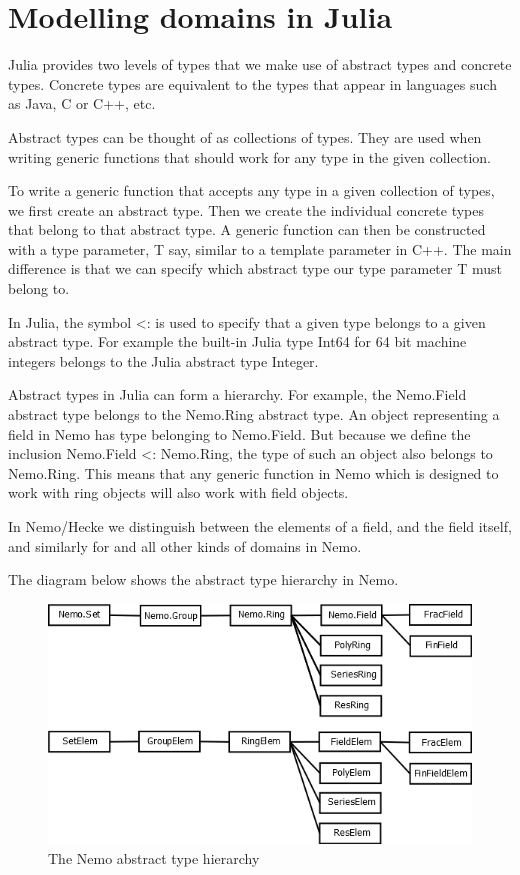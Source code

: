 \documentclass{sig-alternate-05-2015}
\begin{document}
\section{Modelling domains in Julia}

Julia provides two levels of types that we make use of abstract types and concrete types.
Concrete types are equivalent to the types that appear in languages such as Java, C or C++,
etc.

Abstract types can be thought of as collections of types. They are used when writing generic
functions that should work for any type in the given collection.

To write a generic function that accepts any type in a given collection of types, we first
create an abstract type. Then we create the individual concrete types that belong to that
abstract type. A generic function can then be constructed with a type parameter, T
say, similar to a template parameter in C++. The main difference is that we can specify
which abstract type our type parameter T must belong to.

In Julia, the symbol <: is used to specify that a given type belongs to a given abstract type.
For example the built-in Julia type Int64 for 64 bit machine integers belongs to the Julia
abstract type Integer.

Abstract types in Julia can form a hierarchy. For example, the Nemo.Field abstract type belongs
to the Nemo.Ring abstract type. An object representing a field in Nemo has type belonging to
Nemo.Field. But because we define the inclusion Nemo.Field <: Nemo.Ring, the type of such an
object also belongs to Nemo.Ring. This means that any generic function in Nemo which is designed
to work with ring objects will also work with field objects.

In Nemo/Hecke we distinguish between the elements of a field, and the field itself, and similarly
for and all other kinds of domains in Nemo. 

The diagram below shows the abstract type hierarchy in Nemo.

\begin{figure}[h]
\centering
\includegraphics[scale=0.37]{types.png}
\caption{The Nemo abstract type hierarchy}
\end{figure}
\end{document}
